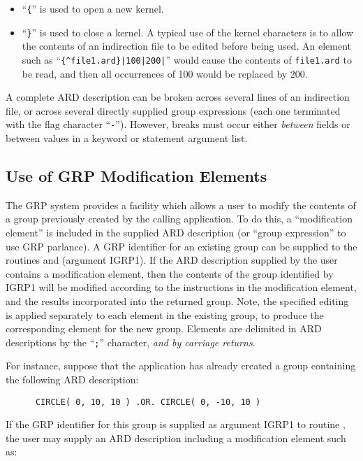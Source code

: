 \begin{itemize}
\item ``\verb+{+'' is used to open a new kernel. 

\item ``\verb+}+'' is used to close a kernel. A typical use of the kernel
characters is to allow the contents of an indirection file to be edited before
being used. An element such as ``\verb+{^file1.ard}|100|200|+'' would cause the
contents of \verb+file1.ard+ to be read, and then all occurrences of 100 would
be replaced by 200. 

\end{itemize}

A complete ARD description can be broken across several lines of an indirection
file, or across several directly supplied group expressions (each one terminated
with the flag character ``\verb+-+''). However, breaks must occur either {\em
between} fields or between values in a keyword or statement argument list. 

\subsection{\label{SEC:MOD}Use of GRP Modification Elements}
The GRP system provides a facility which allows a user to modify the
contents of a group previously created by the calling application. To do
this, a ``modification element'' is included in the supplied ARD
description (or ``group expression'' to use GRP parlance). A GRP
identifier for an existing group can be supplied to the routines
 and 
(argument IGRP1). If the ARD description supplied by the user contains a
modification element, then the contents of the group identified by IGRP1
will be modified according to the instructions in the modification
element, and the results incorporated into the returned group. Note, the
specified editing is applied separately to each element in the existing
group, to produce the corresponding element for the new group. Elements are
delimited in ARD descriptions by the ``\verb+;+'' character, {\em and by 
carriage returns}.

For instance, suppose that the application has already created a group 
containing the following ARD description:

\small
\begin{verbatim}
      CIRCLE( 0, 10, 10 ) .OR. CIRCLE( 0, -10, 10 )
\end{verbatim}
\normalsize

If the GRP identifier for this group is supplied as argument IGRP1 to
routine , the user may supply an ARD 
description including a modification element such as:

